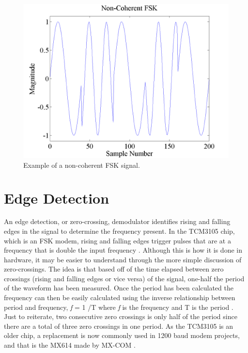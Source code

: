 \begin{figure}
  \centering
	\includegraphics[width=0.75\linewidth]{images/NonCoherentFSK.png} 
	\caption{Example of a non-coherent FSK signal.}
   \label{noncoherentFSKExample}
\end{figure}

\section{Edge Detection}
An edge detection, or zero-crossing, demodulator identifies rising and falling edges in the signal to determine the frequency present. In the TCM3105 chip, which is an FSK modem, rising and falling edges trigger pulses that are at a frequency that is double the input frequency \cite{Instruments1994}. Although this is how it is done in hardware, it may be easier to understand through the more simple discussion of zero-crossings. The idea is that based off of the time elapsed between zero crossings (rising and falling edges or vice versa) of the signal, one-half the period of the waveform has been measured. Once the period has been calculated the frequency can then be easily calculated using the inverse relationship between period and frequency, \textit{f} = 1 /T where \textit{f} is the frequency and T is the period \cite{Seguine2006}. Just to reiterate, two consecutive zero crossings is only half of the period since there are a total of three zero crossings in one period. As the TCM3105 is an older chip, a replacement is now commonly used in 1200 baud modem projects, and that is the MX614 made by MX-COM \cite{Mitrenga2000}.

